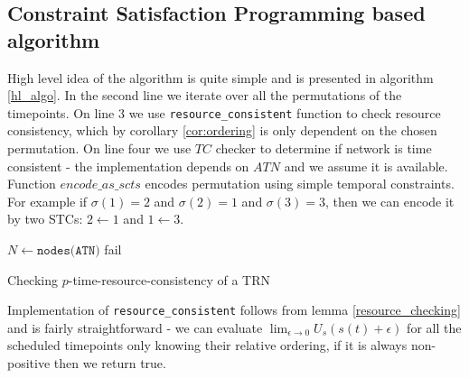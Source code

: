 \documentclass{article}
\begin{document}
\begin{multicols}{2}
\subsection{Constraint Satisfaction Programming based algorithm}
High level idea of the algorithm is quite simple and is presented in algorithm \ref{hl_algo}. In the second line we iterate over all the permutations of the timepoints. On line 3 we use \texttt{resource\_consistent} function to check resource consistency, which by corollary \ref{cor:ordering} is only dependent on the chosen permutation. On line four we use $TC$ checker to determine if network is time consistent - the implementation depends on $ATN$ and we assume it is available. Function $encode\_as\_scts$ encodes permutation using simple temporal constraints. For example if $\sigma(1) = 2$ and $\sigma(2) = 1$ and $\sigma(3) = 3$, then we can encode it by two STCs: $ 2 \leftarrow 1 $ and $1 \leftarrow 3$.

\begin{algorithm}[H]
    \label{hl_algo}
    $N \leftarrow \texttt{nodes(ATN)}$\;
    fail\;
    \caption{Checking $p$-time-resource-consistency of a TRN }
\end{algorithm}
Implementation of \texttt{resource\_consistent} follows from lemma \ref{resource_checking} and is fairly straightforward - we can evaluate $\lim_{\epsilon \to 0} U_s(s(t) + \epsilon)$ for all the scheduled timepoints only knowing their relative ordering, if it is always non-positive then we return true.


\end{multicols}
\end{document}
